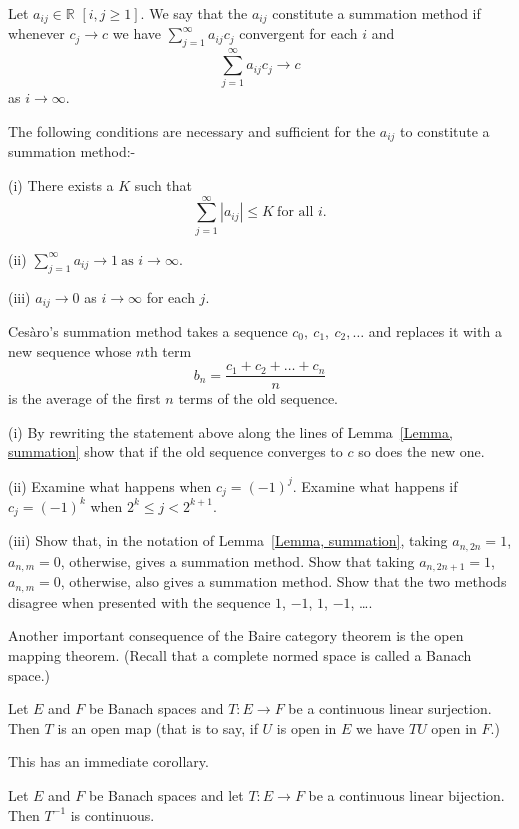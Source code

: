 \begin{lemma}\label{Lemma, summation}
Let $a_{ij}\in{\mathbb R}$ $[i,j\geq 1]$.
We say that the $a_{ij}$ constitute a summation
method if whenever $c_{j}\rightarrow c$ we have
$\sum_{j=1}^{\infty}a_{ij}c_{j}$ convergent for each $i$
and
\[\sum_{j=1}^{\infty}a_{ij}c_{j}\rightarrow c\]
as $i\rightarrow\infty$.

The following conditions are necessary and sufficient
for the $a_{ij}$ to constitute a summation method:-

(i) There exists a $K$ such that
\[\sum_{j=1}^{\infty}|a_{ij}|\leq K\ \text{for all $i$}.\]

(ii) ${\displaystyle
\sum_{j=1}^{\infty}a_{ij}\rightarrow 1\ \text{as $i\rightarrow\infty$}}$.

(iii) $a_{ij}\rightarrow 0$ as $i\rightarrow\infty$ for each $j$.
\end{lemma}
\begin{exercise} Ces\`{a}ro's summation method takes
a sequence $c_{0},\ c_{1},\ c_{2},\dots $ and replaces it
with a new sequence whose $n$th term
\[b_{n}=\frac{c_{1}+c_{2}+\dots+c_{n}}{n}\]
is the average of the first $n$ terms of the old sequence.

(i) By rewriting the statement above along the lines
of Lemma~\ref{Lemma, summation} show that if the old
sequence converges to $c$ so does the new one.

(ii) Examine what happens when $c_{j}=(-1)^{j}$.
Examine what happens if $c_{j}=(-1)^{k}$ when
$2^{k}\leq j<2^{k+1}$.

(iii) Show that, in the notation of Lemma~\ref{Lemma, summation},
taking $a_{n,2n}=1$, $a_{n,m}=0$, otherwise, gives a summation
method. Show that
taking $a_{n,2n+1}=1$, $a_{n,m}=0$, otherwise, 
also gives a summation
method. Show that the two methods disagree
when presented with the sequence $1$, $-1$, $1$, $-1$, \dots. 
\end{exercise}
Another important consequence of the Baire
category theorem is the open mapping theorem.
(Recall that a complete normed space is called
a Banach space.)
\begin{theorem}
Let $E$ and $F$ be Banach spaces and
$T:E\rightarrow F$ be a continuous linear
surjection. Then $T$ is an open map
(that is to say, if $U$ is open in $E$
we have $TU$ open in $F$.)
\end{theorem}
This has an immediate corollary.
\begin{theorem}
Let $E$ and $F$ be Banach spaces and let
$T:E\rightarrow F$ be a continuous linear
bijection. Then $T^{-1}$ is continuous.
\end{theorem}
